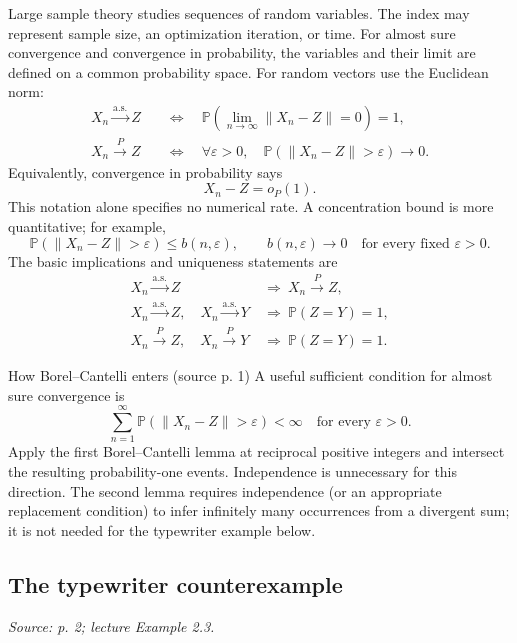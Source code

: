 \documentclass[12pt]{article}
\newcommand{\Prob}{\mathbb P}
\begin{document}
Large sample theory studies sequences of random variables. The index may
represent sample size, an optimization iteration, or time. For almost sure
convergence and convergence in probability, the variables and their limit
are defined on a common probability space. For random vectors use the
Euclidean norm:
\begin{align}
 X_n\xrightarrow{\mathrm{a.s.}}Z
 &\quad\Longleftrightarrow\quad
 \Prob\!\left(\lim_{n\to\infty}\|X_n-Z\|=0\right)=1,\\
 X_n\xrightarrow{P}Z
 &\quad\Longleftrightarrow\quad
 \forall\varepsilon>0,\quad\Prob(\|X_n-Z\|>\varepsilon)\longrightarrow0.
\end{align}
Equivalently, convergence in probability says
\begin{equation}
 X_n-Z=o_P(1).
\end{equation}
This notation alone specifies no numerical rate. A concentration bound is
more quantitative; for example,
\begin{equation}
 \Prob(\|X_n-Z\|>\varepsilon)\le b(n,\varepsilon),
 \qquad b(n,\varepsilon)\longrightarrow0
 \quad\text{for every fixed }\varepsilon>0.
\end{equation}
The basic implications and uniqueness statements are
\begin{align}
 X_n\xrightarrow{\mathrm{a.s.}}Z&\ \Longrightarrow\ X_n\xrightarrow{P}Z,\\
 X_n\xrightarrow{\mathrm{a.s.}}Z,\quad X_n\xrightarrow{\mathrm{a.s.}}Y
 &\ \Longrightarrow\ \Prob(Z=Y)=1,\\
 X_n\xrightarrow{P}Z,\quad X_n\xrightarrow{P}Y
 &\ \Longrightarrow\ \Prob(Z=Y)=1.
\end{align}
\begin{conceptbox}{How Borel--Cantelli enters (source p. 1)}
A useful sufficient condition for almost sure convergence is
\begin{equation}
 \sum_{n=1}^{\infty}\Prob(\|X_n-Z\|>\varepsilon)<\infty
 \quad\text{for every }\varepsilon>0.
\end{equation}
Apply the first Borel--Cantelli lemma at reciprocal positive integers and
intersect the resulting probability-one events. Independence is unnecessary
for this direction. The second lemma requires independence (or an appropriate
replacement condition) to infer infinitely many occurrences from a divergent
sum; it is not needed for the typewriter example below.
\end{conceptbox}

\subsection{The typewriter counterexample}
\textit{Source: p. 2; lecture Example 2.3.}
\end{document}
